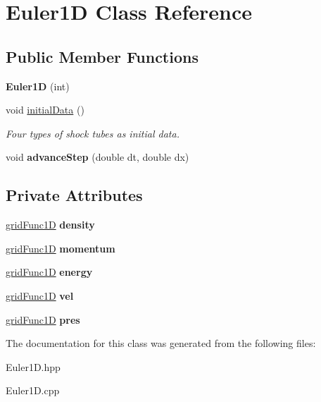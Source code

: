 \hypertarget{class_euler1_d}{\section{Euler1\-D Class Reference}
\label{class_euler1_d}
}
\subsection*{Public Member Functions}
\begin{DoxyCompactItemize}
\item 
\hypertarget{class_euler1_d_a7009e18c0f214cc82ef8f0b4e7733994}{{\bfseries Euler1\-D} (int)}\label{class_euler1_d_a7009e18c0f214cc82ef8f0b4e7733994}

\item 
\hypertarget{class_euler1_d_a8845cc91484190557695396e45709476}{void \hyperlink{class_euler1_d_a8845cc91484190557695396e45709476}{initial\-Data} ()}\label{class_euler1_d_a8845cc91484190557695396e45709476}

\begin{DoxyCompactList}\small\item\em Four types of shock tubes as initial data. \end{DoxyCompactList}\item 
\hypertarget{class_euler1_d_a41c3841d9c5c95831bbae94447f31f56}{void {\bfseries advance\-Step} (double dt, double dx)}\label{class_euler1_d_a41c3841d9c5c95831bbae94447f31f56}

\end{DoxyCompactItemize}
\subsection*{Private Attributes}
\begin{DoxyCompactItemize}
\item 
\hypertarget{class_euler1_d_a80c5fb3a209f1f2a306324e6354fbd29}{\hyperlink{classgrid_func1_d}{grid\-Func1\-D} {\bfseries density}}\label{class_euler1_d_a80c5fb3a209f1f2a306324e6354fbd29}

\item 
\hypertarget{class_euler1_d_a16cd22f859fad0f5e1a85b47ad825453}{\hyperlink{classgrid_func1_d}{grid\-Func1\-D} {\bfseries momentum}}\label{class_euler1_d_a16cd22f859fad0f5e1a85b47ad825453}

\item 
\hypertarget{class_euler1_d_abd55dab4381001fa2b4cb45f1c636f29}{\hyperlink{classgrid_func1_d}{grid\-Func1\-D} {\bfseries energy}}\label{class_euler1_d_abd55dab4381001fa2b4cb45f1c636f29}

\item 
\hypertarget{class_euler1_d_afdcce9b7ef7de7fe2a26bd4ea3e3566a}{\hyperlink{classgrid_func1_d}{grid\-Func1\-D} {\bfseries vel}}\label{class_euler1_d_afdcce9b7ef7de7fe2a26bd4ea3e3566a}

\item 
\hypertarget{class_euler1_d_a24fad57738dc8b7c25f7abc99bcc42ce}{\hyperlink{classgrid_func1_d}{grid\-Func1\-D} {\bfseries pres}}\label{class_euler1_d_a24fad57738dc8b7c25f7abc99bcc42ce}

\end{DoxyCompactItemize}


The documentation for this class was generated from the following files\-:\begin{DoxyCompactItemize}
\item 
Euler1\-D.\-hpp\item 
Euler1\-D.\-cpp\end{DoxyCompactItemize}
